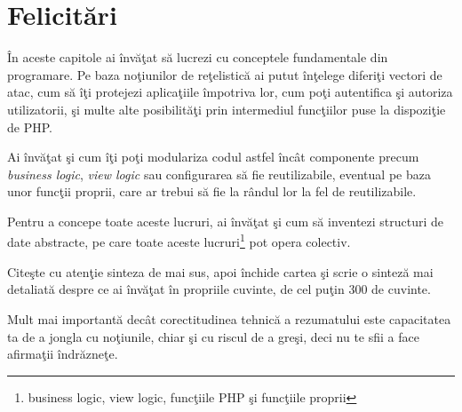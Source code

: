 \section{Felicitări}
În aceste capitole ai învăţat să lucrezi cu conceptele fundamentale
din programare. Pe baza noţiunilor de reţelistică ai putut înţelege
diferiţi vectori de atac, cum să îţi protejezi aplicaţiile împotriva
lor, cum poţi autentifica şi autoriza utilizatorii, şi multe
alte posibilităţi prin intermediul funcţiilor puse la dispoziţie de
PHP.

Ai învăţat şi cum îţi poţi modulariza codul astfel încât componente
precum \textit{business logic}, \textit{view logic} sau configurarea să fie
reutilizabile, eventual pe baza unor funcţii proprii, care ar
trebui să fie la rândul lor la fel de reutilizabile.

Pentru a concepe toate aceste lucruri, ai învăţat şi cum să inventezi
structuri de date abstracte, pe care toate aceste
lucruri\footnote{business logic, view logic, funcţiile PHP şi
funcţiile proprii} pot opera colectiv.

\begin{Exercise}[title={Recapitulare şi sinteză}]
Citeşte cu atenţie sinteza de mai sus, apoi închide cartea şi scrie o
sinteză mai detaliată despre ce ai învăţat în propriile cuvinte,
de cel puţin 300 de cuvinte.

Mult mai importantă dec\^at corectitudinea tehnică a rezumatului
este capacitatea ta de a jongla cu noţiunile, chiar şi cu
riscul de a greşi, deci nu te sfii a face afirmaţii \^indrăzneţe.
\end{Exercise}
